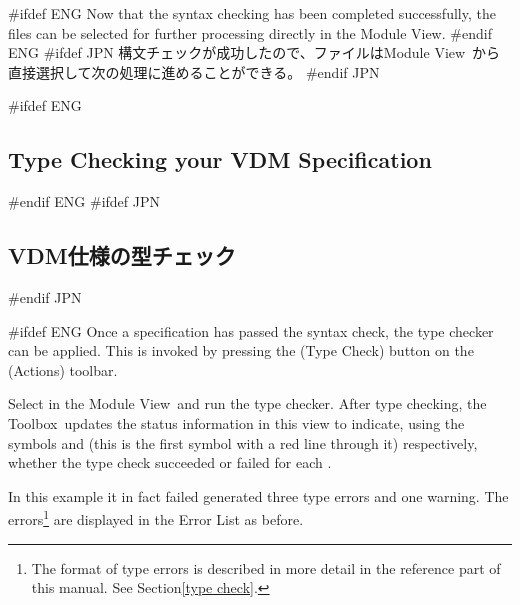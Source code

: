 \documentclass[\pformat,12pt]{article}
\newcommand{\Toolbox}{Toolbox}
\newcommand{\vdmModView}{\guicmd{Module View}}
\newcommand{\vdmModView}{\guicmd{モジュールビュー}}
\newcommand{\Toolbox}{Toolbox}
\newcommand{\vdmModView}{\guicmd{VDM View}}
\newcommand{\vdmModView}{\guicmd{VDMビュー}}
\newcommand{\guicmd}[1]{{\sf #1}}
\newcommand{\guicmd}[1]{{\gt #1}}
\begin{document}
#ifdef ENG
Now that the syntax checking has been completed successfully, the
files can be selected for further processing directly in the \vdmModView.
#endif ENG
#ifdef JPN
構文チェックが成功したので、ファイルは\vdmModView\ から直接選択して次の処理に進めることができる。
#endif JPN

#ifdef ENG
\subsection{Type Checking your VDM Specification}
\label{sec:gde-tc}
#endif ENG
#ifdef JPN
\subsection{VDM仕様の型チェック}
\label{sec:gde-tc}
#endif JPN

#ifdef ENG
Once a specification has passed the syntax check, the type checker
can be applied. This is invoked by pressing the 
(\guicmd{Type Check}) button on the (\guicmd{Actions}) toolbar.

Select  in the \vdmModView\ and run the type 
checker. After type checking, the \Toolbox\ updates the status 
  information in this view to indicate,
using the symbols 
and
(this is the first symbol
with a red line through it) 
respectively, whether the type check succeeded or failed for each
.

In this example it in fact failed 
generated three type errors and one warning. The errors\footnote{The
  format of type errors is described in more detail in the reference
  part of this manual. See Section\ref{type check}.} are displayed in
the \guicmd{Error List} as before.
\end{document}
